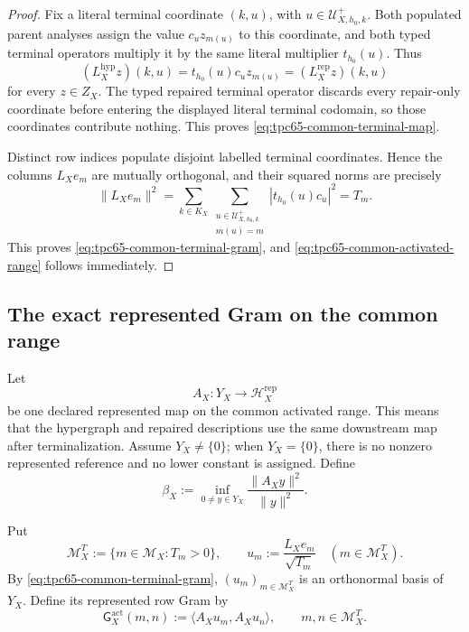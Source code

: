 \begin{proof}
Fix a literal terminal coordinate \((k,u)\), with
\(u\in\mathcal U_{X,h_0,k}^{+}\).  Both populated parent analyses assign
the value \(c_u z_{m(u)}\) to this coordinate, and both typed terminal
operators multiply it by the same literal multiplier \(t_{h_0}(u)\).
Thus
\[
 (L_X^{\mathrm{hyp}}z)(k,u)
 =
 t_{h_0}(u)c_u z_{m(u)}
 =
 (L_X^{\mathrm{rep}}z)(k,u)
\]
for every \(z\in Z_X\). The typed repaired terminal operator discards every
repair-only coordinate before entering the displayed literal terminal
codomain, so those coordinates contribute nothing. This proves
\eqref{eq:tpc65-common-terminal-map}.

Distinct row indices populate disjoint labelled terminal coordinates.
Hence the columns \(L_Xe_m\) are mutually orthogonal, and their squared
norms are precisely
\[
 \|L_Xe_m\|^2
 =
 \sum_{k\in K_X}
 \sum_{\substack{u\in\mathcal U_{X,h_0,k}^{+}\\m(u)=m}}
 |t_{h_0}(u)c_u|^2
 =T_m.
\]
This proves \eqref{eq:tpc65-common-terminal-gram}, and
\eqref{eq:tpc65-common-activated-range} follows immediately.
\end{proof}

\subsection{The exact represented Gram on the common range}

Let
\[
 A_X:Y_X\longrightarrow\mathcal H_X^{\mathrm{rep}}
\]
be one declared represented map on the common activated range.  This means
that the hypergraph and repaired descriptions use the same downstream map
after terminalization.  Assume \(Y_X\ne\{0\}\); when \(Y_X=\{0\}\), there is
no nonzero represented reference and no lower constant is assigned.  Define
\begin{equation}
 \beta_X
 :=
 \inf_{0\ne y\in Y_X}
 \frac{\|A_Xy\|^2}{\|y\|^2}.
 \label{eq:tpc65-beta-on-range}
\end{equation}

Put
\[
 \mathcal M_X^{T}:=\{m\in\mathcal M_X:T_m>0\},
 \qquad
 u_m:=\frac{L_Xe_m}{\sqrt{T_m}}
 \quad(m\in\mathcal M_X^{T}).
\]
By \eqref{eq:tpc65-common-terminal-gram},
\((u_m)_{m\in\mathcal M_X^{T}}\) is an orthonormal basis of \(Y_X\).
Define its represented row Gram by
\begin{equation}
 \mathsf G_X^{\mathrm{act}}(m,n)
 :=
 \langle A_Xu_m,A_Xu_n\rangle,
 \qquad m,n\in\mathcal M_X^{T}.
 \label{eq:tpc65-activated-row-gram}
\end{equation}

